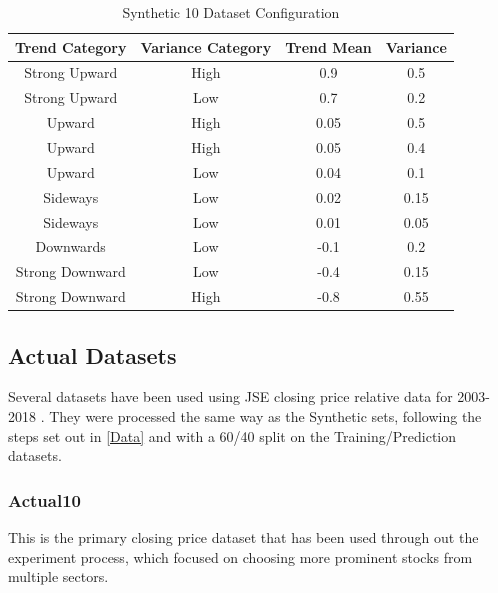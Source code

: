 \documentclass[a4paper,11pt,oneside]{article}
\theoremstyle{plain}
\theoremstyle{definition}
\begin{document}
\begin{table}[H]
	\centering
	\begin{tabular}{|c|c|c|c|}
		\hline
		\textbf{Trend Category} &\textbf{Variance Category} & \textbf{Trend Mean} & \textbf{Variance}\\\hline	
		{Strong Upward} 		& {High} & {0.9} & {0.5} \\\hline
		{Strong Upward} 		& {Low} & {0.7} & {0.2} \\\hline
		{Upward} 					& {High} & {0.05} & {0.5} \\\hline
		{Upward} 					& {High} & {0.05} & {0.4} \\\hline
		{Upward} 					& {Low} & {0.04} & {0.1} \\\hline
		{Sideways} 					& {Low} & {0.02} & {0.15} \\\hline
		{Sideways}					& {Low} & {0.01} & {0.05} \\\hline
		{Downwards}				& {Low} & {-0.1} & {0.2} \\\hline
		{Strong Downward} 	& {Low} & {-0.4} & {0.15} \\\hline
		{Strong Downward}	& {High} & {-0.8} & {0.55} \\\hline
	\end{tabular}
	\newline\newline
	\caption{Synthetic 10 Dataset Configuration}\label{tab_synth10}
\end{table}


\subsection{Actual Datasets}

Several datasets have been used using JSE closing price relative data for 2003-2018 . They were processed the same way as the Synthetic sets, following the steps set out in \ref{Data} and with a 60/40 split on the Training/Prediction datasets.

\subsubsection{Actual10}\label{dataset_actual10}

This is the primary closing price dataset that has been used through out the experiment process, which focused on choosing more prominent stocks from multiple sectors.
\end{document}
